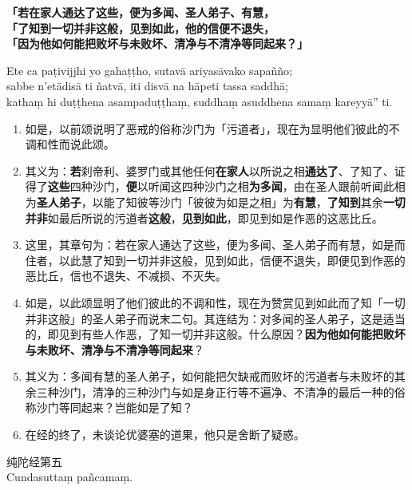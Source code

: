 \textbf{「若在家人通达了这些，便为多闻、圣人弟子、有慧，\\}
\textbf{「了知到一切并非这般，见到如此，他的信便不退失，\\}
\textbf{「因为他如何能把败坏与未败坏、清净与不清净等同起来？」}

Ete ca paṭivijjhi yo gahaṭṭho, sutavā ariyasāvako sapañño;\\
sabbe n’etādisā ti ñatvā, iti disvā na hāpeti tassa saddhā;\\
kathaṃ hi duṭṭhena asampaduṭṭhaṃ, suddhaṃ asuddhena samaṃ kareyyā” ti. %

\begin{enumerate}\item 如是，以前颂说明了恶戒的俗称沙门为「污道者」，现在为显明他们彼此的不调和性而说此颂。
\item 其义为：\textbf{若}刹帝利、婆罗门或其他任何\textbf{在家人}以所说之相\textbf{通达了}、了知了、证得了\textbf{这些}四种沙门，\textbf{便}以听闻这四种沙门之相\textbf{为多闻}，由在圣人跟前听闻此相为\textbf{圣人弟子}，以能了知彼等沙门「彼彼为如是之相」为\textbf{有慧}，\textbf{了知到}其余\textbf{一切并非}如最后所说的污道者\textbf{这般}，\textbf{见到如此}，即见到如是作恶的这恶比丘。
\item 这里，其章句为：若在家人通达了这些，便为多闻、圣人弟子而有慧，如是而住者，以此慧了知到一切并非这般，见到如此，信便不退失，即便见到作恶的恶比丘，信也不退失、不减损、不灭失。
\item 如是，以此颂显明了他们彼此的不调和性，现在为赞赏见到如此而了知「一切并非这般」的圣人弟子而说末二句。其连结为：对多闻的圣人弟子，这是适当的，即见到有些人作恶，了知一切并非这般。什么原因？\textbf{因为他如何能把败坏与未败坏、清净与不清净等同起来}？
\item 其义为：多闻有慧的圣人弟子，如何能把欠缺戒而败坏的污道者与未败坏的其余三种沙门，清净的三种沙门与如是身正行等不遍净、不清净的最后一种的俗称沙门等同起来？岂能如是了知？
\item 在经的终了，未谈论优婆塞的道果，他只是舍断了疑惑。\end{enumerate}

\begin{center}\vspace{1em}纯陀经第五\\Cundasuttaṃ pañcamaṃ.\end{center}

